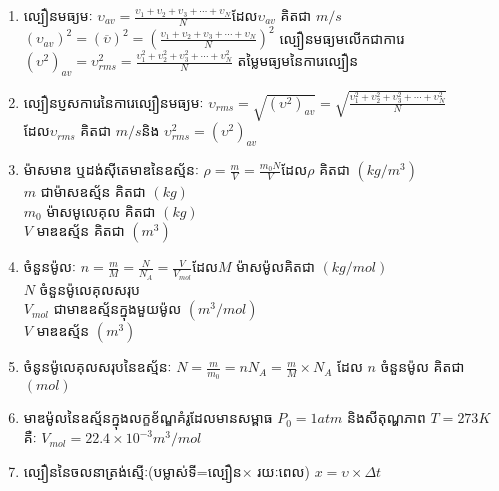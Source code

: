 		\begin{remark}
			\begin{enumerate}[m]
				\item ល្បឿនមធ្យមៈ $\upsilon_{av}=\frac{\upsilon_{1}+\upsilon_{2}+\upsilon_{3}+\cdots+\upsilon_{N}}{N}$\quad ដែល\quad $\upsilon_{av}$ គិតជា $m/s$\\
				$\left(\upsilon_{av}\right)^2=\left(\overline{\upsilon}\right)^2=\left(\frac{\upsilon_1+\upsilon_2+\upsilon_3+\cdots+\upsilon_{N}}{N}\right)^2$ ល្បឿនមធ្យមលើកជាការេ\\
				$\left(\upsilon^2\right)_{av}=\upsilon^2_{rms}=\frac{\upsilon^2_1+\upsilon^2_2+\upsilon^2_3+\cdots+\upsilon^2_{N}}{N}$ តម្លៃមធ្យមនៃការេល្បឿន​\\
				\item ល្បឿនប្ញសការេនៃការេល្បឿនមធ្យមៈ $\upsilon_{rms}=\sqrt{\left(\upsilon^2\right)_{av}}=\sqrt{\frac{\upsilon^2_{1}+\upsilon^2_{2}+\upsilon^2_{3}+ \cdots+\upsilon^2_{N}}{N}}$\quad \\ដែល\quad $\upsilon_{rms}$ គិតជា $m/s$ \quad ​និង
				$\upsilon^2_{rms}=\left(\upsilon^2\right)_{av}$
				\item ម៉ាសមាឌ ឬដង់សុីតេមាឌនៃឧស្ម័នៈ $\rho=\frac{m}{V}=\frac{m_{0}N}{V}$\quad ដែល\quad $\rho$ គិតជា $\left(kg/m^3\right)$\\ $m$ ជាម៉ាសឧស្ម័ន គិតជា $\left(kg\right)$\\ $m_{0}$ ម៉ាសមូលេគុល គិតជា $\left(kg\right)$ 
				\\ $V$ មាឌឧស្ម័ន គិតជា $\left(m^3\right)$
				\item ចំនួនម៉ូលៈ $n=\frac{m}{M}=\frac{N}{N_{A}}=\frac{V}{V_{mol}}$\quad ដែល\quad $M$ ម៉ាសម៉ូលគិតជា $\left(kg/mol\right)$\\
				$N$ ចំនួនម៉ូលេគុលសរុប\\
				$V_{mol}$ ជាមាឌឧស្ម័នក្នុងមួយម៉ូល $\left(m^3/mol\right)$\\
				$V$ មាឌឧស្ម័ន $\left(m^3\right)$
				\item ចំនូនម៉ូលេគុលសរុបនៃឧស្ម័នៈ $N=\frac{m}{m_{0}}=nN_{A}=\frac{m}{M}\times N_{A}$ ដែល $n$ ចំនួនម៉ូល​ គិតជា $\left(mol\right)$
				\item មាឌម៉ូលនៃឧស្ម័នក្នុងលក្ខខ័ណ្ឌគំរូដែលមានសម្ពាធ $P_{0}=1atm$ និងសីតុណ្ហភាព $T=273K$ \\គឺៈ $V_{mol}=22.4\times10^{-3}m^3/mol$
				\item ល្បឿននៃចលនាត្រង់ស្មើៈ(បម្លាស់ទី=ល្បឿន$\times$ រយៈពេល) $x=\upsilon\times\Delta t$
			\end{enumerate}
		\end{remark}